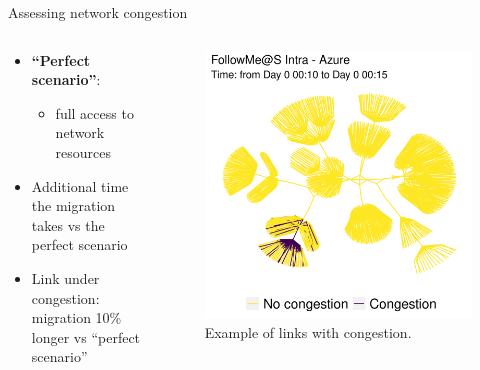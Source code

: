 \documentclass[Ligatures=TeX,table,svgnames,usetotalslideindicator,compress,10pt,aspectratio=169]{beamer}
\begin{document}
\begin{frame}{Assessing network congestion}
  \begin{columns}        
\begin{column}{0.6\textwidth}
  \begin{itemize}    
  \item \textbf{\alert{``Perfect scenario''}}:
  \begin{itemize}    
  \item full access to network resources
  \end{itemize}
  \item Additional time the migration takes vs the perfect scenario    
 \item Link under congestion:  migration 10\% longer vs  ``perfect scenario''
  \end{itemize}
\end{column}        
\begin{column}{0.4\textwidth}
  \begin{center}
    \begin{figure}[!h]
      \centering
      \includegraphics[width=\textwidth]{images/example_congestion.png}
      \caption{Example of links with congestion.}
    \end{figure}
  \end{center}

    \end{column}        
\end{columns}


        \end{frame}
\end{document}
